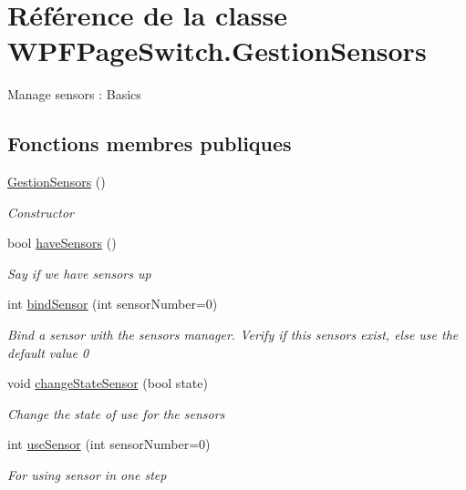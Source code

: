 \hypertarget{class_w_p_f_page_switch_1_1_gestion_sensors}{\section{Référence de la classe W\+P\+F\+Page\+Switch.\+Gestion\+Sensors}
\label{class_w_p_f_page_switch_1_1_gestion_sensors}
}


Manage sensors \+: Basics  


\subsection*{Fonctions membres publiques}
\begin{DoxyCompactItemize}
\item 
\hyperlink{class_w_p_f_page_switch_1_1_gestion_sensors_ae262a06ff6fd96ac83e35f0de7849033}{Gestion\+Sensors} ()
\begin{DoxyCompactList}\small\item\em Constructor \end{DoxyCompactList}\item 
bool \hyperlink{class_w_p_f_page_switch_1_1_gestion_sensors_a44e7b3e836e45430085d0784a5e8a2a1}{have\+Sensors} ()
\begin{DoxyCompactList}\small\item\em Say if we have sensors up \end{DoxyCompactList}\item 
int \hyperlink{class_w_p_f_page_switch_1_1_gestion_sensors_a3efdbf6f6f0a86e4d392f0d912a845c2}{bind\+Sensor} (int sensor\+Number=0)
\begin{DoxyCompactList}\small\item\em Bind a sensor with the sensors manager. Verify if this sensors exist, else use the default value 0 \end{DoxyCompactList}\item 
void \hyperlink{class_w_p_f_page_switch_1_1_gestion_sensors_a0a487c7612aa0f77f3c3e4c364bb3807}{change\+State\+Sensor} (bool state)
\begin{DoxyCompactList}\small\item\em Change the state of use for the sensors \end{DoxyCompactList}\item 
int \hyperlink{class_w_p_f_page_switch_1_1_gestion_sensors_aea312a173b28c0b43dc2072f89e8679c}{use\+Sensor} (int sensor\+Number=0)
\begin{DoxyCompactList}\small\item\em For using sensor in one step \end{DoxyCompactList}\item 

\end{DoxyCompactItemize}
